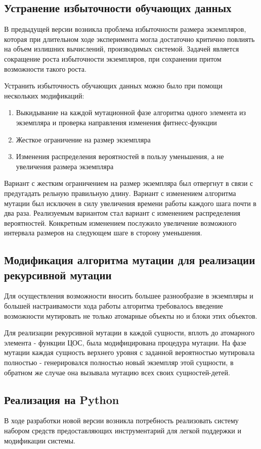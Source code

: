 \documentclass[utf8,usehyperref,12pt]{G7-32}
\begin{document}
\subsection{Устранение избыточности обучающих данных}
В предыдущей версии возникла проблема избыточности размера экземпляров, которая при длительном ходе эксперимента могла достаточно критично повлиять на объем излишних вычислений, производимых системой. Задачей является сокращение роста избыточности экземпляров, при сохранении притом возможности такого роста.

Устранить избыточность обучающих данных можно было при помощи нескольких модификаций:
\begin{enumerate}
\item Выкидывание на каждой мутационной фазе алгоритма одного элемента из экземпляра и проверка направления изменения фитнесс-функции
\item Жесткое ограничение на размер экземпляра
\item Изменения распределения вероятностей в пользу уменьшения, а не увеличения размера экземпляра
\end{enumerate}
Вариант с жестким ограничением на размер экземпляра был отвергнут в связи с предугадать рельную правильную длину. Вариант с изменением алгоритма мутации был исключен в силу увеличения времени работы каждого шага почти в два раза. Реализуемым вариантом стал вариант с изменением распределения вероятностей. Конкретным изменением послужило увеличение возможного интервала размеров на следующем шаге в сторону уменьшения.

\subsection{Модификация алгоритма мутации для реализации рекурсивной мутации}
Для осуществления возможности вносить большее разнообразие в экземпляры и большей настраивамости хода работы алгоритма требовалось введение возможности мутировать не только атомарные объекты но и блоки этих объектов.

Для реализации рекурсивной мутации в каждой сущности, вплоть до атомарного элемента - функции ЦОС, была модифицирована процедура мутации. На фазе мутации каждая сущность верхнего уровня с заданной вероятностью мутировала полностью - генерировался полностью новый экземпляр этой сущности, в обратном же случае она вызывала мутацию всех своих сущностей-детей.

\subsection{Реализация на Python}
В ходе разработки новой версии возникла потребность реализовать систему набором средств предоставляющих инструментарий для легкой поддержки и модификации системы.
\end{document}
